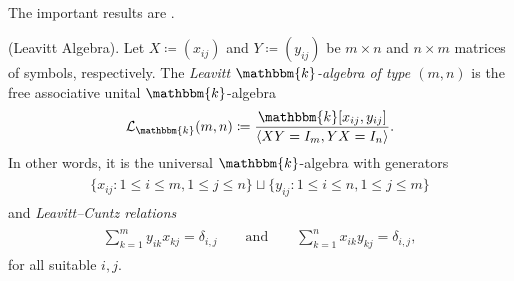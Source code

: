 \noindent\\ The important results are \cite[Theorem 1 and Theorem 2]{EG17}.\\

\noindent\begin{definition}\textup{(Leavitt Algebra).} Let $X \coloneqq (x_{ij})$ and $Y \coloneqq (y_{ij})$ be $m \times n$ and $n \times m$ matrices of symbols, respectively. The {\em Leavitt $\mathbbm{k}$-algebra of type $(m, n)$} is the free associative unital $\mathbbm{k}$-algebra
\begin{align*}
\begin{split}
\mathcal{L}_\mathbbm{k}(m, n) \coloneqq \frac{\mathbbm{k}[x_{ij}, y_{ij}]}{\langle XY = I_m, YX = I_n\rangle}.
\end{split}
\end{align*}
\noindent In other words, it is the universal $\mathbbm{k}$-algebra with generators
\begin{align*}
\begin{split}
\{x_{ij} : 1 \leq i \leq m, 1 \leq j \leq n\} \sqcup \{y_{ij} : 1 \leq i \leq n, 1 \leq j \leq m\}
\end{split}
\end{align*}
\noindent and {\em Leavitt--Cuntz relations}
\begin{align*}
\begin{split}
\sum_{k=1}^m y_{ik} x_{kj} = \delta_{i,j}\qquad\text{and}\qquad\sum_{k=1}^n x_{ik} y_{kj} = \delta_{i,j},
\end{split}
\end{align*}
\noindent for all suitable $i, j$.\\
\end{definition}

